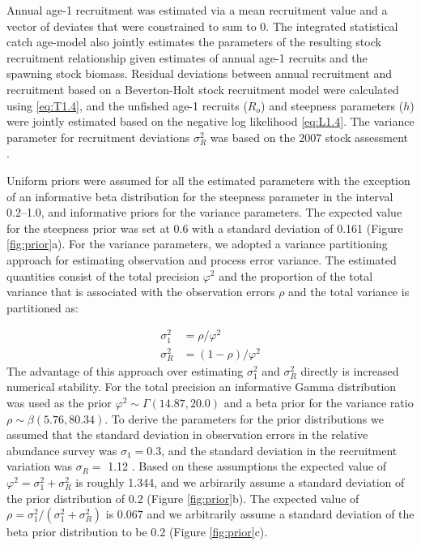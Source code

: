 \documentclass[review,letterpaper,10pt,authoryear]{elsarticle}
\begin{document}
Annual age-1 recruitment was estimated via a mean recruitment value and a vector of deviates that were constrained to sum to 0.  The integrated statistical catch age-model also jointly estimates the parameters of the resulting stock recruitment relationship given estimates of annual age-1 recruits and the  spawning stock biomass.  Residual deviations between annual recruitment and recruitment based on a Beverton-Holt stock recruitment model were calculated using \eqref{eq:T1.4}, and the unfished age-1 recruits ($R_o$) and steepness parameters ($h$) were jointly estimated based on the negative log likelihood \eqref{eq:L1.4}.  The variance parameter for recruitment deviations $\sigma_R^2$ was based on the 2007 stock assessment \citep{helser2007stock}.

Uniform priors were assumed for all the estimated parameters with the exception of an informative beta distribution for the steepness parameter in the interval 0.2--1.0, and informative priors for the variance parameters.  The expected value for the steepness prior was set at 0.6 with a standard deviation of 0.161 (Figure \ref{fig:prior}a).  For the variance parameters, we adopted a variance partitioning approach for estimating observation and process error variance. The estimated quantities consist of the total precision $\varphi^2$ and the proportion of the total variance that is associated with the observation errors $\rho$ and the total variance is partitioned as:  

\begin{align}
	\sigma^2_1 &= \rho/\varphi^2 \nonumber \\
	\sigma^2_R   &= (1-\rho)/\varphi^2 \label{eq:variance}
\end{align}
The advantage of this approach over estimating $\sigma_1^2$ and $\sigma_R^2$ directly is increased numerical stability.  For the total precision an informative Gamma distribution was used as the prior $\varphi^2 \sim \Gamma(14.87,20.0)$ and a beta prior for the variance ratio $\rho \sim \beta(5.76,80.34)$. To derive the parameters for the prior distributions we assumed that the standard deviation in observation errors in the relative abundance survey was $\sigma_1 = $0.3, and the standard deviation in the recruitment variation was $\sigma_R = $ 1.12 \citep[These values were taken from the 2007 assessment][]{helser2007stock}. Based on these assumptions the expected value of $\varphi^2 = \sigma_1^2 + \sigma_R^2$ is roughly 1.344, and we arbirarily assume a standard deviation of the prior distribution of 0.2 (Figure \ref{fig:prior}b). The expected value of $\rho = \sigma_1^2 / (\sigma_1^2 + \sigma_R^2)$ is 0.067 and we arbitrarily assume a standard deviation of the beta prior distribution to be 0.2 (Figure \ref{fig:prior}c).
\end{document}
